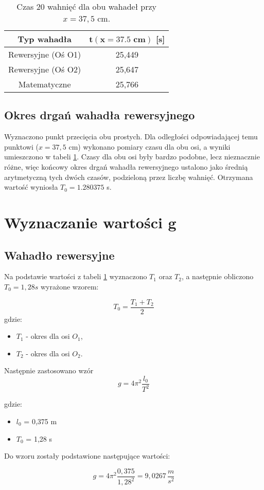 \documentclass[a4paper,12pt]{article}
\begin{document}
\begin{table}[h]
  \centering
  \begin{tabular}{|c|c|}
    \hline
    \textbf{Typ wahadła} & \textbf{$\mathbf{t(x=37.5\text{ cm})}$ [s]} \\
    \hline
    Rewersyjne (Oś O1) & 25,449 \\
    \hline
    Rewersyjne (Oś O2) & 25,647 \\
    \hline
    Matematyczne & 25,766 \\
    \hline
  \end{tabular}
  \caption{Czas 20 wahnięć dla obu wahadeł przy $x=37,5$ cm.}
  \label{tab:czasy}
\end{table}
\newpage

\subsection{Okres drgań wahadła rewersyjnego}

Wyznaczono punkt przecięcia obu prostych. Dla odległości odpowiadającej temu punktowi ($x=37,5$ cm) wykonano pomiary czasu dla obu osi, a wyniki umieszczono w tabeli \ref{tab:czasy}. Czasy dla obu osi były bardzo podobne, lecz nieznacznie różne, więc końcowy okres drgań wahadła rewersyjnego ustalono jako średnią arytmetyczną tych dwóch czasów, podzieloną przez liczbę wahnięć. Otrzymana wartość wyniosła $T_0 = 1.280375$ s.

\section{Wyznaczanie wartości g}

\subsection{Wahadło rewersyjne}
Na podstawie wartości z tabeli \ref{tab:czasy} wyznaczono $T_1$ oraz $T_2$, a następnie obliczono $T_0=1,28 s$ wyrażone wzorem:\par

$$T_0=\frac{T_1+T_2}{2}$$
gdzie:
\begin{itemize}
  \item \( T_1 \) - okres dla osi $O_1$,
  \item \( T_2 \) - okres dla osi $O_2$.
\end{itemize}\par
Następnie zastosowano wzór
\begin{equation}
  g=4\pi^2\frac{l_0}{T^2}
\end{equation} \par
gdzie:
\begin{itemize}
  \item \( l_0 \) = 0,375 m
  \item \( T_0 \) = 1,28 s
\end{itemize}\par
Do wzoru zostały podstawione następujące wartości:\par
\begin{equation}
  g=4 \pi^2\frac{0,375}{1,28^2}=9,0267\,\frac{m}{s^2}
\end{equation} \par
\end{document}
